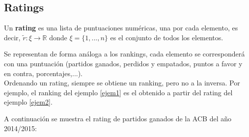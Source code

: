 \subsection{Ratings}
\begin{defi} 
	Un \textbf{rating} es una lista de puntuaciones numéricas, una por cada elemento, es decir, $\tilde{r}: \xi \rightarrow \mathbb{R}$ donde $\xi = \{1,...,n\}$ es el conjunto de todos los elementos.
\end{defi}
Se representan de forma análoga a los rankings, cada elemento se corresponderá con una puntuación (partidos ganados, perdidos y empatados, puntos a favor y en contra, porcentajes,...).\\

Ordenando un rating, siempre se obtiene un ranking, pero no a la inversa. Por ejemplo, el ranking del ejemplo \ref{ejem1} es el obtenido a partir del rating del ejemplo \ref{ejem2}.

\newpage  
 
\begin{ejem} \label{ejem2}
 A continuación se muestra el rating de partidos ganados de la ACB del año 2014/2015:
\end{ejem}
	

